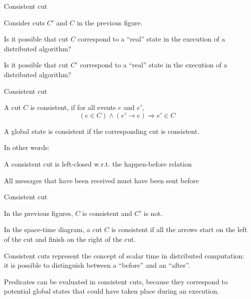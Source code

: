 \begin{frame}{Consistent cut}

Consider cuts $C'$ and $C$ in the previous figure.
\BIL
\item Is it possible that cut $C$ correspond to a ``real'' state in the
  execution of a distributed algorithm?
\item Is it possible that cut $C'$ correspond to a ``real'' state in the
  execution of a distributed algorithm?
\EIL
\end{frame}

\begin{frame}{Consistent cut}

\begin{definition}
A cut $C$ is \alert{consistent}, if for all events $e$ and $e'$,
\[
  (e \in C) \wedge (e' \rightarrow e) \Rightarrow e' \in C
\]
\end{definition}

\begin{definition}
A global state is \alert{consistent} if the corresponding cut is consistent.
\end{definition}

\medskip
In other words: 
\BI
  \item A consistent cut is left-closed w.r.t. the happen-before relation
  \item All messages that have been received must have been sent before
\EI

\end{frame}



\begin{frame}{Consistent cut}

\BI
\item In the previous figures, $C$ is consistent and $C'$ is not.
\item In the space-time diagram, a cut $C$ is consistent if all
  the arrows start on the left of the cut and finish on the right
  of the cut.
\item Consistent cuts represent the concept of scalar time in distributed
  computation: it is possible to distinguish between a ``before'' and
  an ``after''.
\item \alert{Predicates} can be evaluated in consistent cuts, because they correspond
to potential global states that could have taken place during an execution.
\EI
\end{frame}



